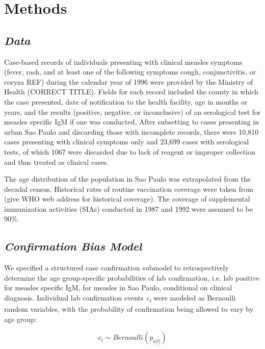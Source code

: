 \section{\texorpdfstring{\textbf{Methods}}{Methods}}\label{methods}

\subsection{\texorpdfstring{\emph{Data}}{Data}}\label{data}

Case-based records of individuals presenting with clinical measles
symptoms (fever, rash, and at least one of the following symptoms cough,
conjunctivitis, or coryza REF) during the calendar year of 1996 were
provided by the Ministry of Health (CORRECT TITLE). Fields for each
record included the county in which the case presented, date of
notification to the health facility, age in months or years, and the
results (positive, negative, or inconclusive) of an serological test for
measles specific IgM if one was conducted. After subsetting to cases
presenting in urban Sao Paulo and discarding those with incomplete
records, there were 10,810 cases presenting with clinical symptoms only
and 23,699 cases with serological tests, of which 1067 were discarded
due to lack of reagent or improper collection and thus treated as
clinical cases.

The age distribution of the population in Sao Paulo was extrapolated
from the decadal census. Historical rates of routine vaccination
coverage were taken from (give WHO web address for historical coverage).
The coverage of supplemental immunization activities (SIAs) conducted in
1987 and 1992 were assumed to be 90\%.

\subsection{\texorpdfstring{\emph{Confirmation Bias
Model}}{Confirmation Bias Model}}\label{confirmation-bias-model}

We specified a structured case confirmation submodel to retrospectively
determine the age group-specific probabilities of lab confirmation, i.e.
lab positive for measles specific IgM, for measles in Sao Paulo,
conditional on clinical diagnosis. Individual lab confirmation events
\emph{c\textsubscript{i}} were modeled as Bernoulli random variables,
with the probability of confirmation being allowed to vary by age group:

\[c_{i} \sim Bernoulli(p_{a\lbrack i\rbrack})\]

